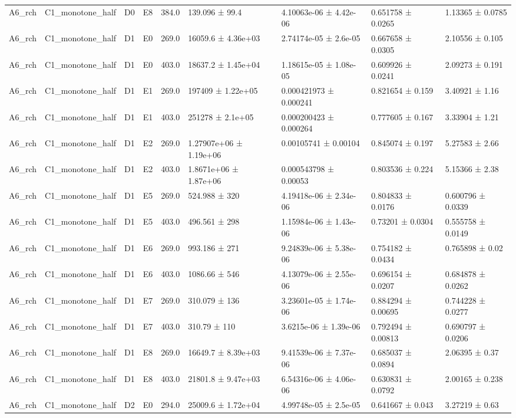 \begin{table}
\begin{tabular}{lllllllll}
A6\_rch & C1\_monotone\_half & D0 & E8 & 384.0 & 139.096 ± 99.4 & 4.10063e-06 ± 4.42e-06 & 0.651758 ± 0.0265 & 1.13365 ± 0.0785 \\
A6\_rch & C1\_monotone\_half & D1 & E0 & 269.0 & 16059.6 ± 4.36e+03 & 2.74174e-05 ± 2.6e-05 & 0.667658 ± 0.0305 & 2.10556 ± 0.105 \\
A6\_rch & C1\_monotone\_half & D1 & E0 & 403.0 & 18637.2 ± 1.45e+04 & 1.18615e-05 ± 1.08e-05 & 0.609926 ± 0.0241 & 2.09273 ± 0.191 \\
A6\_rch & C1\_monotone\_half & D1 & E1 & 269.0 & 197409 ± 1.22e+05 & 0.000421973 ± 0.000241 & 0.821654 ± 0.159 & 3.40921 ± 1.16 \\
A6\_rch & C1\_monotone\_half & D1 & E1 & 403.0 & 251278 ± 2.1e+05 & 0.000200423 ± 0.000264 & 0.777605 ± 0.167 & 3.33904 ± 1.21 \\
A6\_rch & C1\_monotone\_half & D1 & E2 & 269.0 & 1.27907e+06 ± 1.19e+06 & 0.00105741 ± 0.00104 & 0.845074 ± 0.197 & 5.27583 ± 2.66 \\
A6\_rch & C1\_monotone\_half & D1 & E2 & 403.0 & 1.8671e+06 ± 1.87e+06 & 0.000543798 ± 0.00053 & 0.803536 ± 0.224 & 5.15366 ± 2.38 \\
A6\_rch & C1\_monotone\_half & D1 & E5 & 269.0 & 524.988 ± 320 & 4.19418e-06 ± 2.34e-06 & 0.804833 ± 0.0176 & 0.600796 ± 0.0339 \\
A6\_rch & C1\_monotone\_half & D1 & E5 & 403.0 & 496.561 ± 298 & 1.15984e-06 ± 1.43e-06 & 0.73201 ± 0.0304 & 0.555758 ± 0.0149 \\
A6\_rch & C1\_monotone\_half & D1 & E6 & 269.0 & 993.186 ± 271 & 9.24839e-06 ± 5.38e-06 & 0.754182 ± 0.0434 & 0.765898 ± 0.02 \\
A6\_rch & C1\_monotone\_half & D1 & E6 & 403.0 & 1086.66 ± 546 & 4.13079e-06 ± 2.55e-06 & 0.696154 ± 0.0207 & 0.684878 ± 0.0262 \\
A6\_rch & C1\_monotone\_half & D1 & E7 & 269.0 & 310.079 ± 136 & 3.23601e-05 ± 1.74e-06 & 0.884294 ± 0.00695 & 0.744228 ± 0.0277 \\
A6\_rch & C1\_monotone\_half & D1 & E7 & 403.0 & 310.79 ± 110 & 3.6215e-06 ± 1.39e-06 & 0.792494 ± 0.00813 & 0.690797 ± 0.0206 \\
A6\_rch & C1\_monotone\_half & D1 & E8 & 269.0 & 16649.7 ± 8.39e+03 & 9.41539e-06 ± 7.37e-06 & 0.685037 ± 0.0894 & 2.06395 ± 0.37 \\
A6\_rch & C1\_monotone\_half & D1 & E8 & 403.0 & 21801.8 ± 9.47e+03 & 6.54316e-06 ± 4.06e-06 & 0.630831 ± 0.0792 & 2.00165 ± 0.238 \\
A6\_rch & C1\_monotone\_half & D2 & E0 & 294.0 & 25009.6 ± 1.72e+04 & 4.99748e-05 ± 2.5e-05 & 0.641667 ± 0.043 & 3.27219 ± 0.63 \\

\end{tabular}
\end{table}
